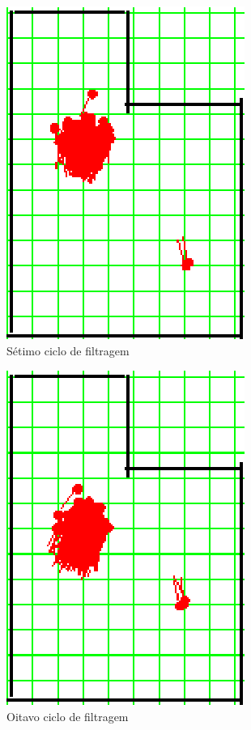 \begin{figure}[H]
  \centering
  \includegraphics[scale=0.6]{figuras/cen1_ex2/8.eps}
  \caption[Sétimo Ciclo de Filtragem]{Sétimo ciclo de filtragem}
  \label{img:cen1_ex2_8}
\end{figure}

\begin{figure}[H]
  \centering
  \includegraphics[scale=0.6]{figuras/cen1_ex2/9.eps}
  \caption[Oitavo Ciclo de Filtragem]{Oitavo ciclo de filtragem}
  \label{img:cen1_ex2_9}
\end{figure}

